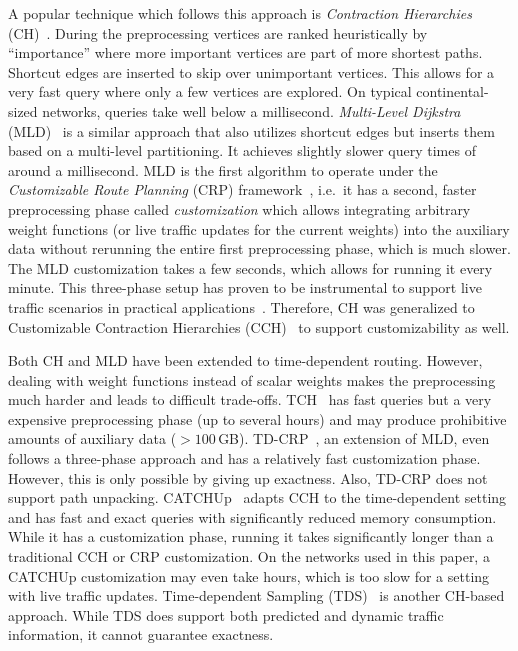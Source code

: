 \documentclass[a4paper,UKenglish,cleveref, autoref, thm-restate]{lipics-v2021}
\begin{document}
A popular technique which follows this approach is \emph{Contraction Hierarchies} (CH)~\cite{gssv-erlrn-12}.
During the preprocessing vertices are ranked heuristically by ``importance'' where more important vertices are part of more shortest paths.
Shortcut edges are inserted to skip over unimportant vertices.
This allows for a very fast query where only a few vertices are explored.
On typical continental-sized networks, queries take well below a millisecond.
\emph{Multi-Level Dijkstra} (MLD)~\cite{swz-umlgt-02} is a similar approach that also utilizes shortcut edges but inserts them based on a multi-level partitioning.
It achieves slightly slower query times of around a millisecond.
MLD is the first algorithm to operate under the \emph{Customizable Route Planning} (CRP) framework~\cite{dgpw-crprn-13}, i.e.\ it has a second, faster preprocessing phase called \emph{customization} which allows integrating arbitrary weight functions (or live traffic updates for the current weights) into the auxiliary data without rerunning the entire first preprocessing phase, which is much slower.
The MLD customization takes a few seconds, which allows for running it every minute.
This three-phase setup has proven to be instrumental to support live traffic scenarios in practical applications~\cite{bingblog}.
Therefore, CH was generalized to Customizable Contraction Hierarchies (CCH)~\cite{dsw-cch-15} to support customizability as well.

Both CH and MLD have been extended to time-dependent routing.
However, dealing with weight functions instead of scalar weights makes the preprocessing much harder and leads to difficult trade-offs.
TCH~\cite{bgsv-mtdtt-13} has fast queries but a very expensive preprocessing phase (up to several hours) and may produce prohibitive amounts of auxiliary data ($> 100$\,GB).
TD-CRP~\cite{bdpw-dtdrp-16}, an extension of MLD, even follows a three-phase approach and has a relatively fast customization phase.
However, this is only possible by giving up exactness.
Also, TD-CRP does not support path unpacking.
CATCHUp~\cite{swz-sfert-21} adapts CCH to the time-dependent setting and has fast and exact queries with significantly reduced memory consumption.
While it has a customization phase, running it takes significantly longer than a traditional CCH or CRP customization.
On the networks used in this paper, a CATCHUp customization may even take hours, which is too slow for a setting with live traffic updates.
Time-dependent Sampling (TDS)~\cite{strasser:OASIcs:2017:7897} is another CH-based approach.
While TDS does support both predicted and dynamic traffic information, it cannot guarantee exactness.
\end{document}
